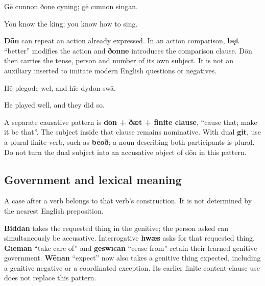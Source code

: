 Gē cunnon ðone cyning; gē cunnon singan.

You know the king; you know how to sing.

\textbf{Dōn} can repeat an action already expressed. In an action comparison, \textbf{bęt} “better” modifies the action and \textbf{ðonne} introduces the comparison clause. Dōn then carries the tense, person and number of its own subject. It is not an auxiliary inserted to imitate modern English questions or negatives.

Hē plegode wel, and hīe dydon swā.

He played well, and they did so.

A separate causative pattern is \textbf{dōn + ðæt + finite clause}, “cause that; make it be that”. The subject inside that clause remains nominative. With dual \textbf{git}, use a plural finite verb, such as \textbf{bēoð}; a noun describing both participants is plural. Do not turn the dual subject into an accusative object of dōn in this pattern.

\subsection*{Government and lexical meaning}

A case after a verb belongs to that verb’s construction. It is not determined by the nearest English preposition.

\textbf{Biddan} takes the requested thing in the genitive; the person asked can simultaneously be accusative. Interrogative \textbf{hwæs} asks for that requested thing. \textbf{Gīeman} “take care of” and \textbf{geswīcan} “cease from” retain their learned genitive government. \textbf{Wēnan} “expect” now also takes a genitive thing expected, including a genitive negative or a coordinated exception. Its earlier finite content-clause use does not replace this pattern.

